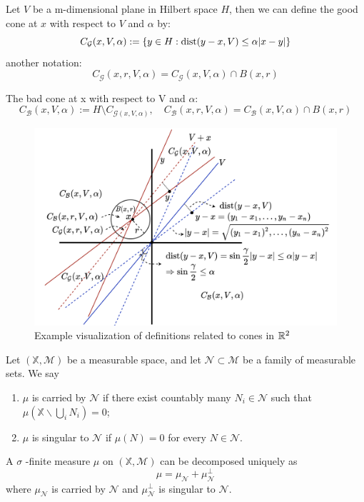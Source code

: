 \begin{definition}
    Let $V$ be a m-dimensional plane in Hilbert space $H$, then we can define the good cone at $x$ with respect to $V$ and $\alpha$ by:
    $$
    C_\mathcal{G}(x, V, \alpha) := \{y\in H: \operatorname{dist}(y-x, V) \leq \alpha |x-y|\}
    $$
    another notation:
    $$
    C_\mathcal{G}(x, r, V, \alpha) = C_\mathcal{G}(x, V, \alpha) \cap B(x, r)
    $$
\end{definition}
\begin{definition}
    The bad cone at x with respect to V and $\alpha$:
    $$
    C_\mathcal{B}(x, V, \alpha) := H\setminus C_{\mathcal{G}(x, V, \alpha)}, \quad C_\mathcal{B}(x, r, V, \alpha) = C_\mathcal{B}(x, V, \alpha) \cap B(x, r)
    $$
\end{definition}


\begin{figure}[H]
    \centering
    \includegraphics[width=.8\textwidth]{images/conedef.png}
    \caption{Example visualization of definitions related to cones in $\mathbb{R}^2$}
\end{figure}

\begin{definition}
   Let $(\mathbb{X}, \mathcal{M})$ be a measurable space, and let $\mathcal{N} \subset \mathcal{M}$ be a family of measurable sets. We say
   \begin{enumerate}[(1)]
       \item $\mu$ is carried by $\mathcal{N}$ if there exist countably many $N_{i} \in \mathcal{N}$ such that $\mu\left(\mathbb{X} \backslash \bigcup_{i} N_{i}\right)=0$;
       \item $\mu$ is singular to $\mathcal{N}$ if $\mu(N)=0$ for every $N \in \mathcal{N}$.    
   \end{enumerate}
   A $\sigma$ -finite measure $\mu$ on $(\mathbb{X}, \mathcal{M})$ can be decomposed uniquely as
       $$
       \mu=\mu_{\mathcal{N}}+\mu_{\mathcal{N}}^{\perp}
       $$
       where $\mu_{\mathcal{N}}$ is carried by $\mathcal{N}$ and $\mu_{\mathcal{N}}^{\perp}$ is singular to $\mathcal{N}$. 
\end{definition}

